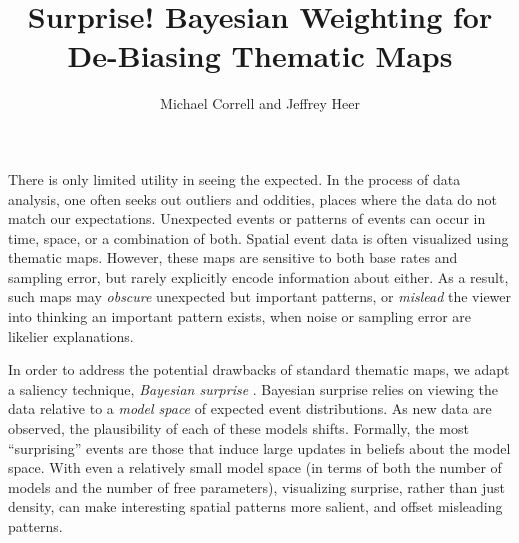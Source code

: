 \documentclass[journal]{vgtc}                %
\title{Surprise! Bayesian Weighting for De-Biasing Thematic Maps}
\author{Michael Correll and Jeffrey Heer}
\begin{document}


\maketitle




There is only limited utility in seeing the expected. In the process of data analysis, one often seeks out outliers and oddities, places where the data do not match our expectations. Unexpected events or patterns of events can occur in time, space, or a combination of both. Spatial event data is often visualized using thematic maps. However, these maps are sensitive to both base rates and sampling error, but rarely explicitly encode information about either. As a result, such maps may \emph{obscure} unexpected but important patterns, or \emph{mislead} the viewer into thinking an important pattern exists, when noise or sampling error are likelier explanations.

In order to address the potential drawbacks of standard thematic maps, we adapt a saliency technique, \emph{Bayesian surprise} \cite{itti2005bayesian}. Bayesian surprise relies on viewing the data relative to a \emph{model space} of expected event distributions. As new data are observed, the plausibility of each of these models shifts. Formally, the most ``surprising'' events are those that induce large updates in beliefs about the model space. With even a relatively small model space (in terms of both the number of models and the number of free parameters), visualizing surprise, rather than just density, can make interesting spatial patterns more salient, and offset misleading patterns.
\end{document}
